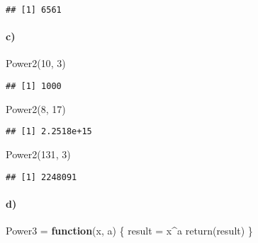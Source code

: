 \documentclass[
]{article}
\newenvironment{Shaded}{\begin{snugshade}}{\end{snugshade}}
\newcommand{\ControlFlowTok}[1]{\textcolor[rgb]{0.13,0.29,0.53}{\textbf{#1}}}
\newcommand{\DecValTok}[1]{\textcolor[rgb]{0.00,0.00,0.81}{#1}}
\newcommand{\FunctionTok}[1]{\textcolor[rgb]{0.00,0.00,0.00}{#1}}
\newcommand{\NormalTok}[1]{#1}
\newcommand{\OtherTok}[1]{\textcolor[rgb]{0.56,0.35,0.01}{#1}}
\newcommand{\SpecialCharTok}[1]{\textcolor[rgb]{0.00,0.00,0.00}{#1}}
\begin{document}
\begin{verbatim}
## [1] 6561
\end{verbatim}

\hypertarget{c-1}{%
\paragraph{c)}\label{c-1}}

\begin{Shaded}
\begin{Highlighting}[]
\FunctionTok{Power2}\NormalTok{(}\DecValTok{10}\NormalTok{, }\DecValTok{3}\NormalTok{)}
\end{Highlighting}
\end{Shaded}

\begin{verbatim}
## [1] 1000
\end{verbatim}

\begin{Shaded}
\begin{Highlighting}[]
\FunctionTok{Power2}\NormalTok{(}\DecValTok{8}\NormalTok{, }\DecValTok{17}\NormalTok{)}
\end{Highlighting}
\end{Shaded}

\begin{verbatim}
## [1] 2.2518e+15
\end{verbatim}

\begin{Shaded}
\begin{Highlighting}[]
\FunctionTok{Power2}\NormalTok{(}\DecValTok{131}\NormalTok{, }\DecValTok{3}\NormalTok{)}
\end{Highlighting}
\end{Shaded}

\begin{verbatim}
## [1] 2248091
\end{verbatim}

\hypertarget{d-1}{%
\paragraph{d)}\label{d-1}}

\begin{Shaded}
\begin{Highlighting}[]
\NormalTok{Power3 }\OtherTok{=} \ControlFlowTok{function}\NormalTok{(x, a) \{}
\NormalTok{    result }\OtherTok{=}\NormalTok{ x}\SpecialCharTok{\^{}}\NormalTok{a}
    \FunctionTok{return}\NormalTok{(result)}
\NormalTok{\}}
\end{Highlighting}
\end{Shaded}
\end{document}
